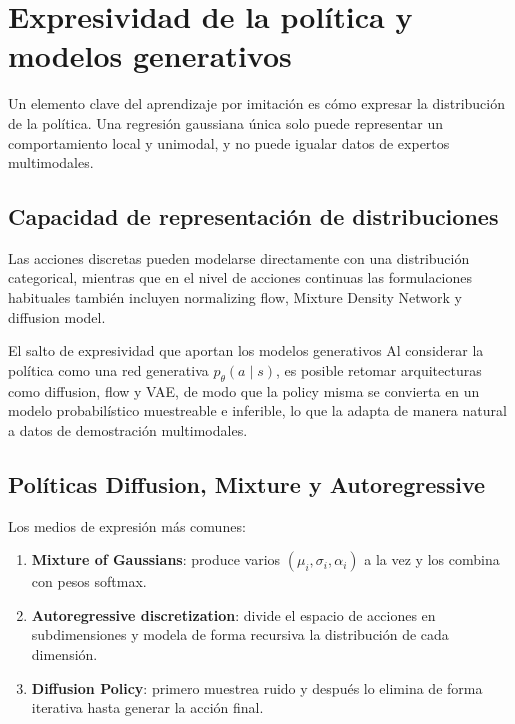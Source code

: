 \section{Expresividad de la política y modelos generativos}

Un elemento clave del aprendizaje por imitación es cómo expresar la distribución de la política. Una regresión gaussiana única solo puede representar un comportamiento local y unimodal, y no puede igualar datos de expertos multimodales.

\subsection{Capacidad de representación de distribuciones}

Las acciones discretas pueden modelarse directamente con una distribución categorical, mientras que en el nivel de acciones continuas las formulaciones habituales también incluyen normalizing flow, Mixture Density Network y diffusion model.

\begin{importantbox}{El salto de expresividad que aportan los modelos generativos}
Al considerar la política como una red generativa $p_\theta(a \mid s)$, es posible retomar arquitecturas como diffusion, flow y VAE, de modo que la policy misma se convierta en un modelo probabilístico muestreable e inferible, lo que la adapta de manera natural a datos de demostración multimodales.
\end{importantbox}

\subsection{Políticas Diffusion, Mixture y Autoregressive}

Los medios de expresión más comunes:
\begin{enumerate}
    \item \textbf{Mixture of Gaussians}: produce varios $(\mu_i, \sigma_i, \alpha_i)$ a la vez y los combina con pesos softmax.
    \item \textbf{Autoregressive discretization}: divide el espacio de acciones en subdimensiones y modela de forma recursiva la distribución de cada dimensión.
    \item \textbf{Diffusion Policy}: primero muestrea ruido y después lo elimina de forma iterativa hasta generar la acción final.
\end{enumerate}

